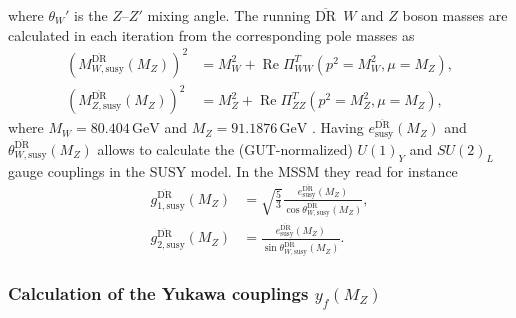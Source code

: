 \documentclass[final,3p,11pt,pdflatex]{elsarticle}
\newcommand{\textoverline}[1]{$\overline{\mbox{#1}}$}
\newcommand{\DRbar}{\textoverline{DR}\xspace}
\newcommand{\unit}[1]{\,\text{#1}}      %
\DeclareMathOperator{\re}{Re}
\begin{document}
%
where $\theta_W'$ is the $Z$--$Z'$ mixing angle.
The running \DRbar\ $W$ and $Z$ boson masses are calculated in each
iteration from the corresponding pole masses as
%
\begin{align}
  \left(M_{W,\text{susy}}^{\text{\DRbar}}(M_Z)\right)^2 &=
  M_W^2 + \re \Pi_{WW}^T(p^2 = M_W^2, \mu=M_Z) ,\\
  \left(M_{Z,\text{susy}}^{\text{\DRbar}}(M_Z)\right)^2 &=
  M_Z^2 + \re \Pi_{ZZ}^T(p^2 = M_Z^2, \mu=M_Z) ,
\end{align}
%
where $M_W = 80.404\unit{GeV}$ and $M_Z = 91.1876\unit{GeV}$
\cite{Beringer:1900zz}.  Having $e_{\text{susy}}^{\text{\DRbar}}(M_Z)$
and $\theta_{W,\text{susy}}^{\text{\DRbar}}(M_Z)$ allows to calculate
the (GUT-normalized) $U(1)_Y$ and $SU(2)_L$ gauge couplings in the
SUSY model.  In the MSSM they read for instance
%
\begin{align}
  g_{1,\text{susy}}^{\text{\DRbar}}(M_Z) &=
  \sqrt{\frac{5}{3}} \frac{e_{\text{susy}}^{\text{\DRbar}}(M_Z)}{\cos\theta_{W,\text{susy}}^{\text{\DRbar}}(M_Z)} ,\\
  g_{2,\text{susy}}^{\text{\DRbar}}(M_Z) &=
  \frac{e_{\text{susy}}^{\text{\DRbar}}(M_Z)}{\sin\theta_{W,\text{susy}}^{\text{\DRbar}}(M_Z)} .
\end{align}

\subsubsection{Calculation of the Yukawa couplings $y_f(M_Z)$}
\label{sec:calculation-of-yukawa-couplings}
\end{document}
